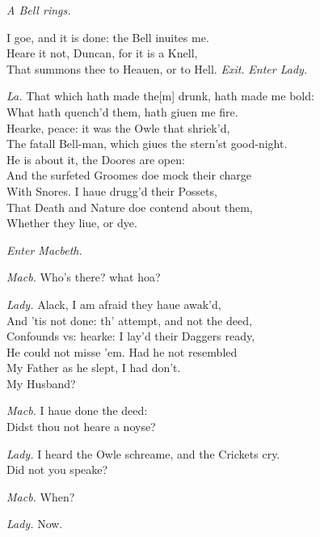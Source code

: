 \documentclass[12pt]{sides}
\newcommand{\clStageDir}[1]{\hspace*{\fill}\textit{#1}\hspace*{\fill}}
\newcommand{\elStageDir}[1]{\hfill\textit{#1}}
\newcommand{\dia}[1]{\hskip 15pt\textit{#1}\hskip 6pt}
\begin{document}
\begin{multicols}{2}
            \elStageDir{A Bell rings.} \hspace{75pt}

            I goe, and it is done: the Bell inuites me. \\ Heare it not, Duncan, for it is a Knell, \\ That summons thee to Heauen, or to Hell. \elStageDir{Exit.} \hspace{8pt} %
            \clStageDir{Enter Lady.}
            
            \dia{La.} That which hath made the[m] drunk, hath made me bold: \\ What hath quench'd them, hath giuen me fire. \\ Hearke, peace: it was the Owle that shriek'd, \\ The fatall Bell-man, which giues the stern'st good-night. \\ He is about it, the Doores are open: \\ And the surfeted Groomes doe mock their charge \\ With Snores. I haue drugg'd their Possets, \\ That Death and Nature doe contend about them, \\ Whether they liue, or dye.
            
            \clStageDir{Enter Macbeth.}
            
            \dia{Macb.} Who's there? what hoa?

            \dia{Lady.} Alack, I am afraid they haue awak'd, \\ And 'tis not done: th' attempt, and not the deed, \\ Confounds vs: hearke: I lay'd their Daggers ready, \\ He could not misse 'em. Had he not resembled \\ My Father as he slept, I had don't. \\ My Husband?

            \dia{Macb.} I haue done the deed: \\ Didst thou not heare a noyse?

            \dia{Lady.} I heard the Owle schreame, and the Crickets cry. \\ Did not you speake?

            \dia{Macb.} When?

            \dia{Lady.} Now.


\end{multicols}
\end{document}
